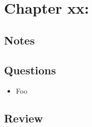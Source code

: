 \section{Chapter xx: }
\subsection{Notes}

\subsection{Questions}
\begin{itemize}
  \item Foo
\end{itemize}

\subsection{Review}
